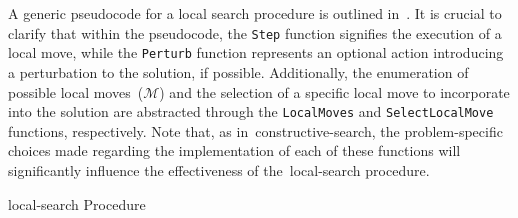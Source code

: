 A generic pseudocode for a local search procedure is outlined
in~. It is crucial to clarify that within the pseudocode, the
\texttt{Step} function signifies the execution of a local move, while the
\texttt{Perturb} function represents an optional action introducing a
perturbation to the solution, if possible. Additionally, the enumeration of
possible local moves~($\mathcal{M}$) and the selection of a specific local move to incorporate
into the solution are abstracted through the \texttt{LocalMoves} and
\texttt{SelectLocalMove} functions, respectively. Note that, as
in~\acrshort{constructive-search}, the problem-specific choices made regarding
the implementation of each of these functions will significantly influence the
effectiveness of the~\acrshort{local-search} procedure.

\begin{algorithm}
  
  \caption{\acrlong{local-search} Procedure}
  \label{algorithm:ls}
\end{algorithm}